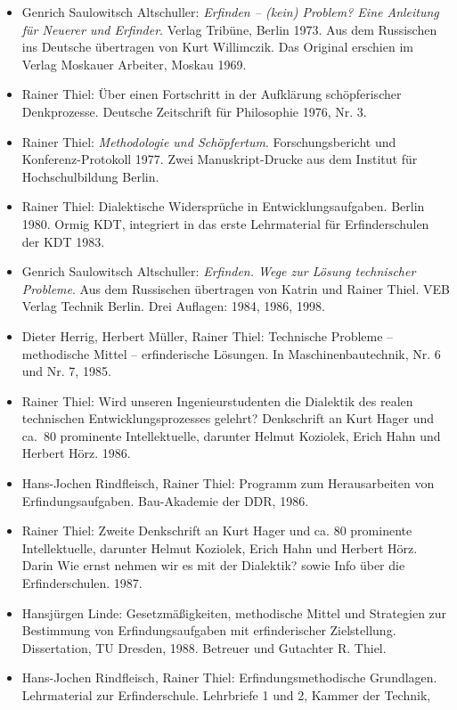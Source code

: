 \documentclass[12pt,a4paper]{article}
\begin{document}
\begin{itemize}
\item Genrich Saulowitsch Altschuller: \emph{Erfinden – (kein) Problem? Eine
  Anleitung für Neuerer und Erfinder}. Verlag Tribüne, Berlin 1973. Aus dem
  Russischen ins Deutsche übertragen von Kurt Willimczik. Das Original erschien
  im Verlag Moskauer Arbeiter, Moskau 1969.
\item Rainer Thiel: Über einen Fortschritt in der Aufklärung schöpferischer
  Denkprozesse. Deutsche Zeitschrift für Philosophie 1976, Nr. 3.
\item Rainer Thiel: \emph{Methodologie und Schöpfertum}. Forschungsbericht und
  Konferenz-Protokoll 1977. Zwei Manuskript-Drucke aus dem Institut für
  Hochschulbildung Berlin.
\item Rainer Thiel: Dialektische Widersprüche in Entwicklungsaufgaben. Berlin
  1980.  Ormig KDT, integriert in das erste Lehrmaterial für Erfinderschulen
  der KDT 1983.
\item Genrich Saulowitsch Altschuller: \emph{Erfinden. Wege zur Lösung
  technischer Probleme}. Aus dem Russischen übertragen von Katrin und Rainer
  Thiel. VEB Verlag Technik Berlin. Drei Auflagen: 1984, 1986, 1998.
\item Dieter Herrig, Herbert Müller, Rainer Thiel: Technische Probleme –
  methodische Mittel – erfinderische Lösungen. In Maschinenbautechnik, Nr. 6
  und Nr. 7, 1985.
\item Rainer Thiel: Wird unseren Ingenieurstudenten die Dialektik des realen
  technischen Entwicklungsprozesses gelehrt? Denkschrift an Kurt Hager und
  ca.\ 80 prominente Intellektuelle, darunter Helmut Koziolek, Erich Hahn und
  Herbert Hörz. 1986.
\item Hans-Jochen Rindfleisch, Rainer Thiel: Programm zum Herausarbeiten von
  Erfindungsaufgaben. Bau-Akademie der DDR, 1986.
\item Rainer Thiel: Zweite Denkschrift an Kurt Hager und ca. 80 prominente
  Intellektuelle, darunter Helmut Koziolek, Erich Hahn und Herbert Hörz. Darin
  {\glqq}Wie ernst nehmen wir es mit der Dialektik?{\grqq} sowie Info über die
  Erfinderschulen. 1987.
\item Hansjürgen Linde: Gesetzmäßigkeiten, methodische Mittel und Strategien
  zur Bestimmung von Erfindungsaufgaben mit erfinderischer Zielstellung.
  Dissertation, TU Dresden, 1988. Betreuer und Gutachter R. Thiel.
\item Hans-Jochen Rindfleisch, Rainer Thiel: Erfindungsmethodische Grundlagen.
  Lehrmaterial zur Erfinderschule. Lehrbriefe 1 und 2, Kammer der Technik,

\end{itemize}
\end{document}
